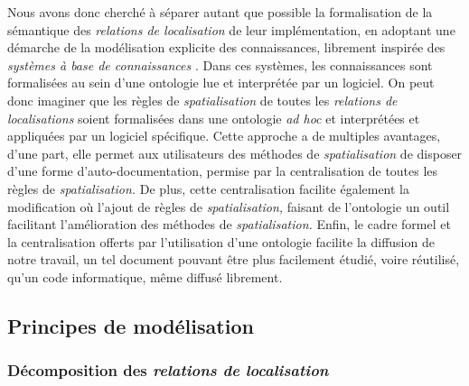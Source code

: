 Nous avons donc cherché à séparer autant que possible la formalisation
de la sémantique des \emph{relations de localisation} de leur
implémentation, en adoptant une démarche de la modélisation explicite
des connaissances, librement inspirée des \emph{systèmes à base de
  connaissances} . Dans ces
systèmes, les connaissances sont formalisées au sein d'une ontologie
lue et interprétée par un logiciel. On peut donc imaginer que les
règles de \emph{spatialisation} de toutes les \emph{relations de
  localisations} soient formalisées dans une ontologie \emph{ad hoc}
et interprétées et appliquées par un logiciel spécifique. Cette
approche a de multiples avantages, d'une part, elle permet aux
utilisateurs des méthodes de \emph{spatialisation} de disposer d'une
forme d'auto-documentation, permise par la centralisation de toutes
les règles de \emph{spatialisation.} De plus, cette centralisation
facilite également la modification où l'ajout de règles de
\emph{spatialisation,} faisant de l'ontologie un outil facilitant
l'amélioration des méthodes de \emph{spatialisation.} Enfin, le cadre
formel et la centralisation offerts par l’utilisation d'une ontologie
facilite la diffusion de notre travail, un tel document pouvant être
plus facilement étudié, voire réutilisé, qu'un code informatique, même
diffusé librement.

\subsection{Principes de modélisation}

\subsubsection{Décomposition des \emph{relations de localisation}}
\label{subsec:4-1-2-1}

